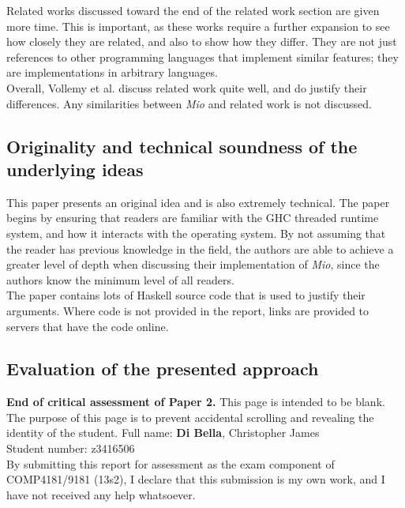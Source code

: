 \documentclass[9pt]{report}
\begin{document}
Related works discussed toward the end of the related work section are given more time.
This is important, as these works require a further expansion to see how closely they are related, and also to show how they differ.
They are not just references to other programming languages that implement similar features; they are implementations in arbitrary languages.\\

Overall, Vollemy et al. discuss related work quite well, and do justify their differences. Any similarities between {\it Mio} and related work is not discussed.

\subsection*{Originality and technical soundness of the underlying ideas}
This paper presents an original idea and is also extremely technical.
The paper begins by ensuring that readers are familiar with the GHC threaded runtime system, and how it interacts with the operating system.
By not assuming that the reader has previous knowledge in the field, the authors are able to achieve a greater level of depth when discussing their implementation of {\it Mio}, since the authors know the minimum level of all readers.\\

The paper contains lots of Haskell source code that is used to justify their arguments.
Where code is not provided in the report, links are provided to servers that have the code online.


\subsection*{Evaluation of the presented approach}

\noindent
{\bf End of critical assessment of Paper 2.}
\clearpage
\noindent
This page is intended to be blank.\\

\noindent
The purpose of this page is to prevent accidental scrolling and revealing the identity of the student.
\clearpage
\noindent
Full name: \hspace{8mm} {\bf Di Bella}, Christopher James\\
Student number: z3416506\\

\noindent
By submitting this report for assessment as the exam component of COMP4181/9181 (13s2), I declare that this submission is my own work, and I have not received any help whatsoever.
\end{document}
